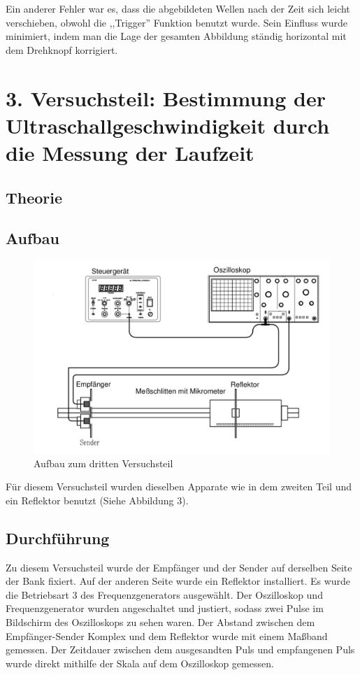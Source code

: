\documentclass[11pt,a4paper]{article}
\begin{document}
Ein anderer Fehler war es, dass die abgebildeten Wellen nach der Zeit sich leicht verschieben, obwohl die ,,Trigger'' Funktion benutzt wurde. Sein Einfluss wurde minimiert, indem man die Lage der gesamten Abbildung ständig horizontal mit dem Drehknopf korrigiert. 





\section{3. Versuchsteil: Bestimmung der Ultraschallgeschwindigkeit durch die Messung der Laufzeit}

\subsection{Theorie}
\subsection{Aufbau}
\begin{figure}[h]
	\centering
	\includegraphics[scale=0.5]{Abb3}
	\caption{Aufbau zum dritten Versuchsteil}
\end{figure}
Für diesem Versuchsteil wurden dieselben Apparate wie in dem zweiten Teil und ein Reflektor benutzt (Siehe Abbildung 3). 

\subsection{Durchführung}
Zu diesem Versuchsteil wurde der Empfänger und der Sender auf derselben Seite der Bank fixiert. Auf der anderen Seite wurde ein Reflektor installiert. Es wurde die Betriebsart 3 des Frequenzgenerators ausgewählt. Der Oszilloskop und Frequenzgenerator wurden angeschaltet und justiert, sodass zwei Pulse im Bildschirm des Oszilloskops zu sehen waren. Der Abstand zwischen dem Empfänger-Sender Komplex und dem Reflektor wurde mit einem Maßband gemessen. Der Zeitdauer zwischen dem ausgesandten Puls und empfangenen Puls wurde direkt mithilfe der Skala auf dem Oszilloskop gemessen. 
\end{document}
